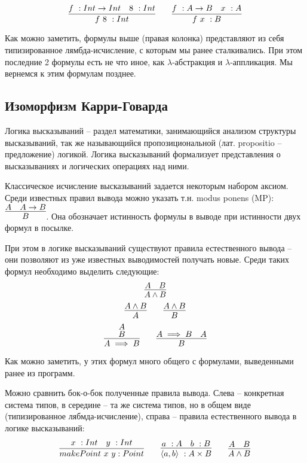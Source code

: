 \documentclass[a4paper,14pt]{extreport} %
\begin{document}
\begin{equation*}
\infer{f \ 8 \ :Int}{%
    f \ :Int \rightarrow Int & 8 \ :Int
}
\qquad
\infer{f \ x \ :B}{%
    f \ :A \rightarrow B & x \ :A
}
\end{equation*}


Как можно заметить, формулы выше (правая колонка) представляют из себя типизированное лямбда-исчисление, с которым мы ранее сталкивались. При этом последние 2 формулы есть не что иное, как $\lambda$-абстракция и $\lambda$-аппликация. Мы вернемся к этим формулам позднее.


\subsection{Изоморфизм Карри-Говарда}

Логика высказываний -- раздел математики, занимающийся анализом структуры высказываний, так же называющийся пропозициональной (лат. propositio -- предложение) логикой. Логика высказываний формализует представления о высказываниях и логических операциях над ними.

Классическое исчисление высказываний задается некоторым набором аксиом. Среди известных правил вывода можно указать т.н. modus ponens (MP):
$\infer{B}{%
    A & A \rightarrow B
}$. Она обозначает истинность формулы в выводе при истинности двух формул в посылке.

При этом в логике высказываний существуют правила естественного вывода -- они позволяют из уже известных выводимостей получать новые. Среди таких формул необходимо выделить следующие:
$$
\infer{A \land B}{%
    A & B
}
$$
\begin{equation*}
\infer{A}{%
    A \land B
}
\qquad  %
\infer{B}{%
    A \land B
}
\end{equation*}
\begin{equation*}
\infer{A \implies B}{%
    \deduce{B}{A}
}
\qquad  %
\infer{B}{%
    A \implies B & A
}
\end{equation*}

Как можно заметить, у этих формул много общего с формулами, выведенными ранее из программ.

Можно сравнить бок-о-бок полученные правила вывода. Слева -- конкретная система типов, в середине -- та же система типов, но в общем виде (типизированное лябмда-исчисление), справа -- правила естественного вывода в логике высказываний:
\begin{equation*}
\infer{makePoint \ x \ y :Point}{%
    x \ :Int & y \ :Int
}
\qquad
\infer{\langle a, b \rangle \ :A \times B}{%
    a \ :A & b \ :B
}
\qquad
\infer{A \land B}{%
    A & B
}
\end{equation*}
\end{document}
